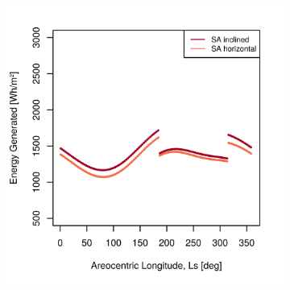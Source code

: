 \begin{figure}[h]
\captionsetup[subfigure]{justification=centering}
\vspace{-2ex}
	\centering
    \setlength{\subfigureWidth}{0.50\textwidth}
    \setlength{\graphicsHeight}{80mm}
    \hypersetup{hidelinks=true}%
    \begin{subfigure}[t]{\subfigureWidth}
        \centering
        \includegraphics[height=\graphicsHeight]{sections/design/solar-array/plots/ianichaos-daily-generated-energy-for-sa-area-27m2.png}
        \label{fig:plot:sub:iani-chaos-generated-energy}
    \end{subfigure}\hfill
    \begin{subfigure}[t]{\subfigureWidth}
        \centering

\end{subfigure}
\end{figure}
